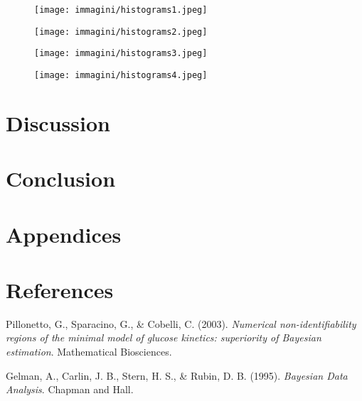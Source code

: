 \documentclass[a4paper,10pt]{report}
\begin{document}
\begin{figure}[h!]
    \centering
    \begin{minipage}{0.65\textwidth}
        \centering
        \texttt{[image: immagini/histograms1.jpeg]}
        \label{fig:immagine1}
    \end{minipage}
    \hfill
    \begin{minipage}{0.65\textwidth}
        \centering
        \texttt{[image: immagini/histograms2.jpeg]}
        \label{fig:immagine2}
    \end{minipage}
     \hfill
    \begin{minipage}{0.65\textwidth}
        \centering
        \texttt{[image: immagini/histograms3.jpeg]}
        \label{fig:immagine2}
    \end{minipage}
    \hfill
    \begin{minipage}{0.65\textwidth}
        \centering
        \texttt{[image: immagini/histograms4.jpeg]}
        \label{fig:immagine2}
    \end{minipage}
\end{figure}


\section{Discussion}


\section{Conclusion}


\section*{Appendices}


\section*{References}
\begin{thebibliography}{9}

Pillonetto, G., Sparacino, G., \& Cobelli, C. (2003).
\textit{Numerical non-identifiability regions of the minimal model of glucose kinetics: superiority of Bayesian estimation}.
Mathematical Biosciences.

Gelman, A., Carlin, J. B., Stern, H. S., \& Rubin, D. B. (1995).
\textit{Bayesian Data Analysis}.
Chapman and Hall.

\end{thebibliography}
\end{document}
